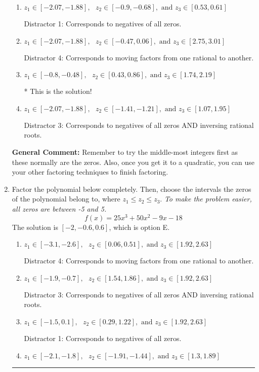 \documentclass{extbook}[14pt]
\newcommand{\litem}[1]{\item #1

\rule{\textwidth}{0.4pt}}
\begin{document}
\begin{enumerate}
{\begin{enumerate}[label=\Alph*.]
 Distractor 2: Corresponds to inversing rational roots.
\item \( z_1 \in [-2.07, -1.88], \text{   }  z_2 \in [-0.9, -0.68], \text{   and   } z_3 \in [0.53, 0.61] \)

 Distractor 1: Corresponds to negatives of all zeros.
\item \( z_1 \in [-2.07, -1.88], \text{   }  z_2 \in [-0.47, 0.06], \text{   and   } z_3 \in [2.75, 3.01] \)

 Distractor 4: Corresponds to moving factors from one rational to another.
\item \( z_1 \in [-0.8, -0.48], \text{   }  z_2 \in [0.43, 0.86], \text{   and   } z_3 \in [1.74, 2.19] \)

* This is the solution!
\item \( z_1 \in [-2.07, -1.88], \text{   }  z_2 \in [-1.41, -1.21], \text{   and   } z_3 \in [1.07, 1.95] \)

 Distractor 3: Corresponds to negatives of all zeros AND inversing rational roots.
\end{enumerate}

\textbf{General Comment:} Remember to try the middle-most integers first as these normally are the zeros. Also, once you get it to a quadratic, you can use your other factoring techniques to finish factoring.
}
\litem{
Factor the polynomial below completely. Then, choose the intervals the zeros of the polynomial belong to, where $z_1 \leq z_2 \leq z_3$. \textit{To make the problem easier, all zeros are between -5 and 5.}
\[ f(x) = 25x^{3} +50 x^{2} -9 x -18 \]The solution is \( [-2, -0.6, 0.6] \), which is option E.\begin{enumerate}[label=\Alph*.]
\item \( z_1 \in [-3.1, -2.6], \text{   }  z_2 \in [0.06, 0.51], \text{   and   } z_3 \in [1.92, 2.63] \)

 Distractor 4: Corresponds to moving factors from one rational to another.
\item \( z_1 \in [-1.9, -0.7], \text{   }  z_2 \in [1.54, 1.86], \text{   and   } z_3 \in [1.92, 2.63] \)

 Distractor 3: Corresponds to negatives of all zeros AND inversing rational roots.
\item \( z_1 \in [-1.5, 0.1], \text{   }  z_2 \in [0.29, 1.22], \text{   and   } z_3 \in [1.92, 2.63] \)

 Distractor 1: Corresponds to negatives of all zeros.
\item \( z_1 \in [-2.1, -1.8], \text{   }  z_2 \in [-1.91, -1.44], \text{   and   } z_3 \in [1.3, 1.89] \)


\end{enumerate}}
\end{enumerate}
\end{document}
